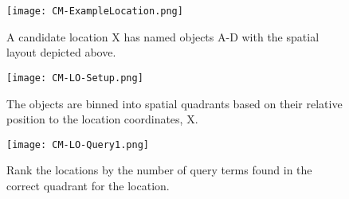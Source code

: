 \begin{figure*}[t]
    \centering
    \begin{subfigure}[t]{.25\textwidth}
        \texttt{[image: CM-ExampleLocation.png]}
        \caption{\small A candidate location X has named objects A-D with the spatial layout depicted above.} 
        \label{fig:CM-LO-Example}
    \end{subfigure}
    \hfill
    \begin{subfigure}[t]{.25\textwidth}
        \texttt{[image: CM-LO-Setup.png]}
        \caption{\small The objects are binned into spatial quadrants based on their relative position to the location coordinates, X.} 
        \label{fig:CM-LO-Setup}
    \end{subfigure}
    \hfill
        \begin{subfigure}[t]{.25\textwidth}
        \texttt{[image: CM-LO-Query1.png]}
        \caption{\small Rank the locations by the number of query terms found in the correct quadrant for the location.}
        \label{fig:CM-LO-Query}
    \hfill
    \end{subfigure}
    \caption{\textbf{Object-Location Search Method. A Location-centric data structure (Figure \ref{fig:CM-LO-Setup}) is generated based on the cardinal relations between the objects and the location (Figure \ref{fig:CM-LO-Example}). Then a pictorial query is matched against the structure (Figure \ref{fig:CM-LO-Query}).}}\label{figure:ConceptMap-LO} 
\end{figure*}





